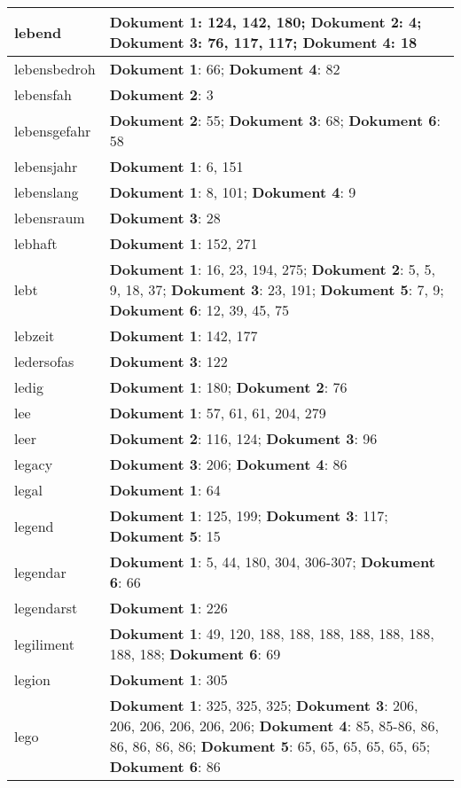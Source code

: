 \documentclass[a5paper]{article}
\begin{document}
\begin{longtable}[l]{|l|p{3in}|}
\hline
lebend & \textbf{Dokument 1}: 124, 142, 180; \textbf{Dokument 2}: 4; \textbf{Dokument 3}: 76, 117, 117; \textbf{Dokument 4}: 18 \\
\hline
lebensbedroh & \textbf{Dokument 1}: 66; \textbf{Dokument 4}: 82 \\
\hline
lebensfah & \textbf{Dokument 2}: 3 \\
\hline
lebensgefahr & \textbf{Dokument 2}: 55; \textbf{Dokument 3}: 68; \textbf{Dokument 6}: 58 \\
\hline
lebensjahr & \textbf{Dokument 1}: 6, 151 \\
\hline
lebenslang & \textbf{Dokument 1}: 8, 101; \textbf{Dokument 4}: 9 \\
\hline
lebensraum & \textbf{Dokument 3}: 28 \\
\hline
lebhaft & \textbf{Dokument 1}: 152, 271 \\
\hline
lebt & \textbf{Dokument 1}: 16, 23, 194, 275; \textbf{Dokument 2}: 5, 5, 9, 18, 37; \textbf{Dokument 3}: 23, 191; \textbf{Dokument 5}: 7, 9; \textbf{Dokument 6}: 12, 39, 45, 75 \\
\hline
lebzeit & \textbf{Dokument 1}: 142, 177 \\
\hline
ledersofas & \textbf{Dokument 3}: 122 \\
\hline
ledig & \textbf{Dokument 1}: 180; \textbf{Dokument 2}: 76 \\
\hline
lee & \textbf{Dokument 1}: 57, 61, 61, 204, 279 \\
\hline
leer & \textbf{Dokument 2}: 116, 124; \textbf{Dokument 3}: 96 \\
\hline
legacy & \textbf{Dokument 3}: 206; \textbf{Dokument 4}: 86 \\
\hline
legal & \textbf{Dokument 1}: 64 \\
\hline
legend & \textbf{Dokument 1}: 125, 199; \textbf{Dokument 3}: 117; \textbf{Dokument 5}: 15 \\
\hline
legendar & \textbf{Dokument 1}: 5, 44, 180, 304, 306-307; \textbf{Dokument 6}: 66 \\
\hline
legendarst & \textbf{Dokument 1}: 226 \\
\hline
legiliment & \textbf{Dokument 1}: 49, 120, 188, 188, 188, 188, 188, 188, 188, 188; \textbf{Dokument 6}: 69 \\
\hline
legion & \textbf{Dokument 1}: 305 \\
\hline
lego & \textbf{Dokument 1}: 325, 325, 325; \textbf{Dokument 3}: 206, 206, 206, 206, 206, 206; \textbf{Dokument 4}: 85, 85-86, 86, 86, 86, 86, 86; \textbf{Dokument 5}: 65, 65, 65, 65, 65, 65; \textbf{Dokument 6}: 86 \\

\end{longtable}
\end{document}
